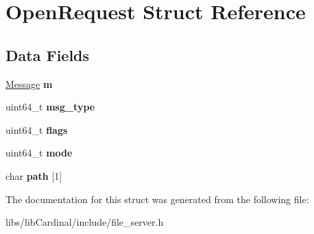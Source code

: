 \hypertarget{structOpenRequest}{}\section{Open\+Request Struct Reference}
\label{structOpenRequest}
\subsection*{Data Fields}
\begin{DoxyCompactItemize}
\item 
\hyperlink{structMessage}{Message} {\bfseries m}\hypertarget{structOpenRequest_aa9e8955885841ab25ee29a96392d23ef}{}\label{structOpenRequest_aa9e8955885841ab25ee29a96392d23ef}

\item 
uint64\+\_\+t {\bfseries msg\+\_\+type}\hypertarget{structOpenRequest_a31644ca6b0b1a11179ef62ab6e7619c7}{}\label{structOpenRequest_a31644ca6b0b1a11179ef62ab6e7619c7}

\item 
uint64\+\_\+t {\bfseries flags}\hypertarget{structOpenRequest_a79a962ced13956c3e6a2d3248d9d55e0}{}\label{structOpenRequest_a79a962ced13956c3e6a2d3248d9d55e0}

\item 
uint64\+\_\+t {\bfseries mode}\hypertarget{structOpenRequest_af46d2407b273b7085c7cbb8636bf3963}{}\label{structOpenRequest_af46d2407b273b7085c7cbb8636bf3963}

\item 
char {\bfseries path} \mbox{[}1\mbox{]}\hypertarget{structOpenRequest_a6c94aca418b4f3cc90cbd05ae6fc64af}{}\label{structOpenRequest_a6c94aca418b4f3cc90cbd05ae6fc64af}

\end{DoxyCompactItemize}


The documentation for this struct was generated from the following file\+:\begin{DoxyCompactItemize}
\item 
libs/lib\+Cardinal/include/file\+\_\+server.\+h\end{DoxyCompactItemize}
